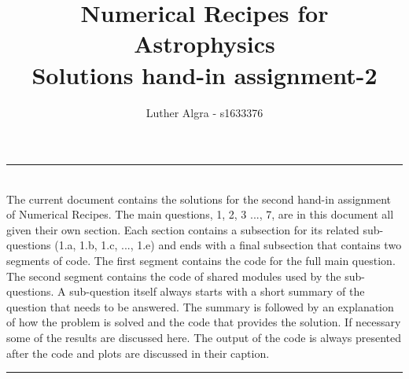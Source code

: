 \documentclass[a4paper,10pt]{article}
\title{\vspace{-1cm}\textbf{Numerical Recipes for Astrophysics \\ Solutions hand-in assignment-2}}
\author{Luther Algra - s1633376}
\renewenvironment{abstract}
 { \vspace*{0.3cm} \textbf{\abstractname} \vspace{0.1cm} \\ \ignorespaces}
 {\par\medskip \vspace{0.1cm}}
\begin{document}
\maketitle
\hrule
\begin{abstract}
The current document contains the solutions for the second hand-in assignment of Numerical Recipes. The main questions, 1, 2, 3 ..., 7, are in this document all given their own section. Each section contains a subsection for its related sub-questions (1.a, 1.b, 1.c, ..., 1.e) and ends with a final subsection that contains two segments of code. The first segment contains the code for the full main question. The second segment contains the code of shared modules used by the sub-questions. A sub-question itself always starts with a short summary of the question that needs to be answered. The summary is followed by an explanation of how the problem is solved and the code that provides the solution. If necessary some of the results are discussed here. The output of the code is always presented after the code and plots are discussed in their caption.


\end{abstract}
\hrule
\vspace{0.5cm}





























%


%





  
\end{document}
